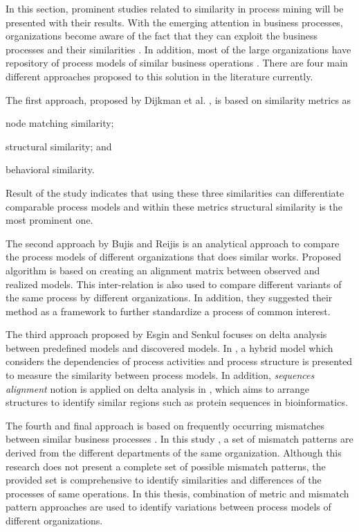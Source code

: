 In this section, prominent studies related to similarity in process mining will be presented with their results. With the emerging attention in business processes, organizations become aware of the fact that they can exploit the business processes and their similarities \cite{buijs2014comparing}. In addition, most of the large organizations have repository of process models of similar business operations \cite{dijkman2011similarity}. There are four main different approaches proposed to this solution in the literature currently. 

The first approach, proposed by Dijkman et al. \cite{dijkman2011similarity}, is based on similarity metrics as 
\begin{inparaenum}
\item node matching similarity;
\item structural similarity; and
\item behavioral similarity.
\end{inparaenum}
Result of the study \cite{dijkman2011similarity} indicates that using these three similarities can differentiate comparable process models and within these metrics structural similarity is the most prominent one. 

The second approach by Bujis and Reijis is an analytical approach \cite{buijs2014comparing} to compare the process models of different organizations that does similar works. Proposed algorithm is based on creating an alignment matrix between observed and realized models. This inter-relation is also used to compare different variants of the same process by different organizations. In addition, they suggested their method as a framework to further standardize a process of common interest. 

The third approach proposed by Esgin and Senkul focuses on delta analysis between predefined models and discovered models. In \cite{esgin2011delta}, a hybrid model which considers the dependencies of process activities and process structure is presented to measure the similarity between process models. In addition, \textit{sequences alignment} notion is applied on delta analysis in \cite{esgin2013sequence}, which aims to arrange structures to identify similar regions such as protein sequences in bioinformatics.

The fourth and final approach is based on frequently occurring mismatches between similar business processes \cite{dijkman2007mismatch}. In this study \cite{dijkman2007mismatch}, a set of mismatch patterns are derived from the different departments of the same organization. Although this research does not present a complete set of possible mismatch patterns, the provided set is comprehensive to identify similarities and differences of the processes of same operations. In this thesis, combination of metric and mismatch pattern approaches are used to identify variations between process models of different organizations.

